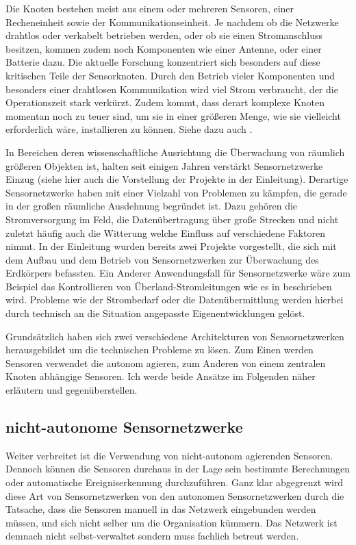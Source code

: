 Die Knoten bestehen meist aus einem oder mehreren Sensoren, einer Recheneinheit sowie der Kommunikationseinheit. Je nachdem ob die Netzwerke drahtlos oder verkabelt betrieben werden, oder ob sie einen Stromanschluss besitzen, kommen zudem noch Komponenten wie einer Antenne, oder einer Batterie dazu. Die aktuelle Forschung konzentriert sich besonders auf diese kritischen Teile der Sensorknoten. Durch den Betrieb vieler Komponenten und besonders einer drahtlosen Kommunikation wird viel Strom verbraucht, der die Operationszeit stark verkürzt. Zudem kommt, dass derart komplexe Knoten momentan noch zu teuer sind, um sie in einer größeren Menge, wie sie vielleicht erforderlich wäre, installieren zu können. Siehe dazu auch \citep{akyildiz_survey_2002}.

In Bereichen deren wissenschaftliche Ausrichtung die Überwachung von räumlich größeren Objekten ist, halten seit einigen Jahren verstärkt Sensornetzwerke Einzug (siehe hier auch die Vorstellung der Projekte in der Einleitung). Derartige Sensornetzwerke haben mit einer Vielzahl von Problemen zu kämpfen, die gerade in der großen räumliche Ausdehnung begründet ist. Dazu gehören die Stromversorgung im Feld, die Datenübertragung über große Strecken und nicht zuletzt häufig auch die Witterung welche Einfluss auf verschiedene Faktoren nimmt. In der Einleitung wurden bereits zwei Projekte vorgestellt, die sich mit dem Aufbau und dem Betrieb von Sensornetzwerken zur Überwachung des Erdkörpers befassten. Ein Anderer Anwendungsfall für Sensornetzwerke wäre zum Beispiel das Kontrollieren von Überland-Stromleitungen wie es in \citep{voigt_autarkes_2012} beschrieben wird. Probleme wie der Strombedarf oder die Datenübermittlung werden hierbei durch technisch an die Situation angepasste Eigenentwicklungen gelöst.

Grundsätzlich haben sich zwei verschiedene Architekturen von Sensornetzwerken herausgebildet um die technischen Probleme zu lösen. Zum Einen werden Sensoren verwendet die autonom agieren, zum Anderen von einem zentralen Knoten abhängige Sensoren. Ich werde beide Ansätze im Folgenden näher erläutern und gegenüberstellen.

\subsection{nicht-autonome Sensornetzwerke}
Weiter verbreitet ist die Verwendung von nicht-autonom agierenden Sensoren. Dennoch können die Sensoren durchaus in der Lage sein bestimmte Berechnungen oder automatische Ereigniserkennung durchzuführen. Ganz klar abgegrenzt wird diese Art von Sensornetzwerken von den autonomen Sensornetzwerken durch die Tatsache, dass die Sensoren manuell in das Netzwerk eingebunden werden müssen, und sich nicht selber um die Organisation kümmern. Das Netzwerk ist demnach nicht selbst-verwaltet sondern muss fachlich betreut werden.

